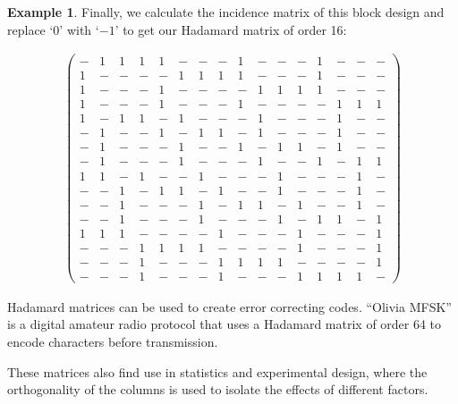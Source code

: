 \documentclass[12pt,a4paper]{article}
\theoremstyle{definition}
\newtheorem{example}[theorem]{Example}
\begin{document}
\begin{example}
Finally, we calculate the incidence matrix of this block design and replace `0' with `$-1$' to get our Hadamard matrix of order 16:

\setcounter{MaxMatrixCols}{20}
\begin{align*}
\begin{pmatrix}
- & 1 & 1 & 1 & 1 & - & - & - & 1 & - & - & - & 1 & - & - & - \\
1 & - & - & - & - & 1 & 1 & 1 & 1 & - & - & - & 1 & - & - & - \\
1 & - & - & - & 1 & - & - & - & - & 1 & 1 & 1 & 1 & - & - & - \\
1 & - & - & - & 1 & - & - & - & 1 & - & - & - & - & 1 & 1 & 1 \\
1 & - & 1 & 1 & - & 1 & - & - & - & 1 & - & - & - & 1 & - & - \\
- & 1 & - & - & 1 & - & 1 & 1 & - & 1 & - & - & - & 1 & - & - \\
- & 1 & - & - & - & 1 & - & - & 1 & - & 1 & 1 & - & 1 & - & - \\
- & 1 & - & - & - & 1 & - & - & - & 1 & - & - & 1 & - & 1 & 1 \\
1 & 1 & - & 1 & - & - & 1 & - & - & - & 1 & - & - & - & 1 & - \\
- & - & 1 & - & 1 & 1 & - & 1 & - & - & 1 & - & - & - & 1 & - \\
- & - & 1 & - & - & - & 1 & - & 1 & 1 & - & 1 & - & - & 1 & - \\
- & - & 1 & - & - & - & 1 & - & - & - & 1 & - & 1 & 1 & - & 1 \\
1 & 1 & 1 & - & - & - & - & 1 & - & - & - & 1 & - & - & - & 1 \\
- & - & - & 1 & 1 & 1 & 1 & - & - & - & - & 1 & - & - & - & 1 \\
- & - & - & 1 & - & - & - & 1 & 1 & 1 & 1 & - & - & - & - & 1 \\
- & - & - & 1 & - & - & - & 1 & - & - & - & 1 & 1 & 1 & 1 & - 
\end{pmatrix}
\end{align*}

\end{example}

Hadamard matrices can be used to create error correcting codes. ``Olivia MFSK'' is a digital amateur radio protocol that uses a Hadamard matrix of order 64 to encode characters before transmission.

These matrices also find use in statistics and experimental design, where the orthogonality of the columns is used to isolate the effects of different factors.

\printbibliography
\end{document}
